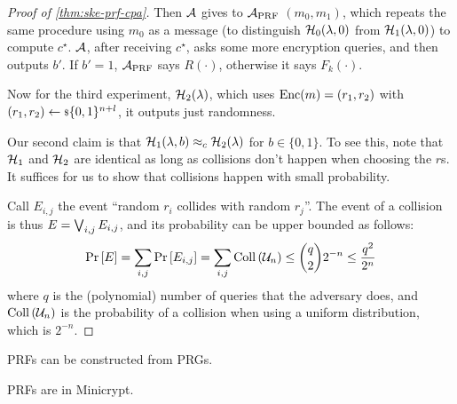 \begin{proof}[Proof of \cref{thm:ske-prf-cpa}]
	Then $\mathcal{A}$ gives to $\mathcal{A}_{\text{PRF}}$ $(m_0, m_1)$, which repeats the same procedure using $m_0$ as a message (to distinguish $\mathcal{H}_0(\lambda, 0)$ from $\mathcal{H}_1(\lambda, 0)$) to compute $c^{\star}$.
	$\mathcal{A}$, after receiving $c^{\star}$, asks some more encryption queries, and then outputs $b'$.
	If $b' = 1$, $\mathcal{A}_{\text{PRF}}$ says $R(\cdot)$, otherwise it says $F_k(\cdot)$.

	Now for the third experiment, $\mathcal{H}_2(\lambda)$, which uses $\mathrm{Enc}(m) = (r_1, r_2)$ with $(r_1, r_2) \leftarrow {\scriptstyle \$} {\{0,1\}^{n+l}}$, \ie it outputs just randomness.

	Our second claim is that $\mathcal{H}_1(\lambda, b) \approx_c \mathcal{H}_2(\lambda)$ for $b \in \{0,1\}$.
	To see this, note that $\mathcal{H}_1$ and $\mathcal{H}_2$ are identical as long as collisions don't happen when choosing the $r$s.
	It suffices for us to show that collisions happen with small probability.

	Call $E_{i,j}$ the event ``random $r_i$ collides with random $r_j$''.
	The event of a collision is thus $E = \bigvee_{i,j} E_{i,j}$, and its probability can be upper bounded as follows:
	\begin{equation*}
		\mathop{\mathrm{Pr}}\limits_{} \left[ {E} \right] = \sum_{i,j} \mathop{\mathrm{Pr}}\limits_{} \left[ {E_{i,j}} \right] = \sum_{i,j} \mathrm{Coll}\left(\mathcal{U}_n\right) \le \binom{q}{2} 2^{-n} \le \frac{q^{2}}{2^{n}}
	\end{equation*}
	where $q$ is the (polynomial) number of queries that the adversary does, and $\mathrm{Coll}\left(\mathcal{U}_n\right)$ is the probability of a collision when using a uniform distribution, which is $2^{-n}$.
\end{proof} 

\begin{theorem}
	\acp{PRF} can be constructed from \acp{PRG}.
\end{theorem}

\begin{corollary}
	\acp{PRF} are in Minicrypt.
\end{corollary}

